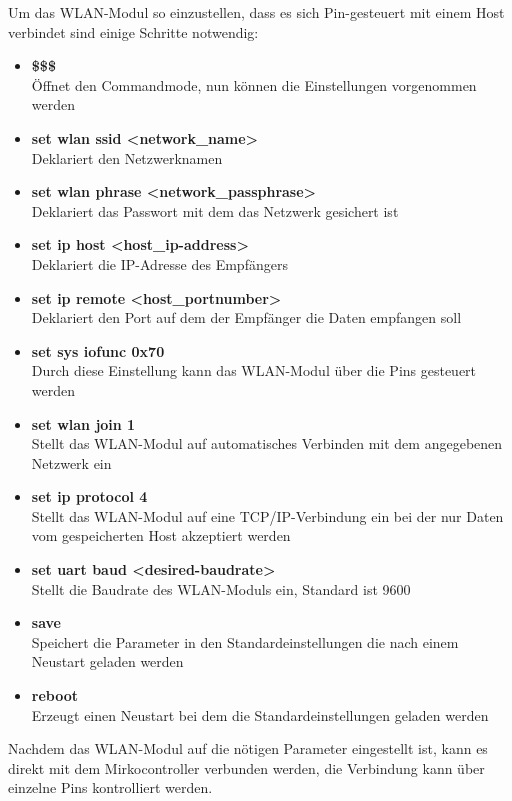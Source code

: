 Um das WLAN-Modul so einzustellen, dass es sich Pin-gesteuert mit einem Host verbindet sind einige Schritte notwendig:
  \begin{itemize}
    \item \textbf{\$\$\$}\\
    Öffnet den Commandmode, nun können die Einstellungen vorgenommen werden
    \item \textbf{set wlan ssid <network\_name>}\\
    Deklariert den Netzwerknamen
    \item \textbf{set wlan phrase <network\_passphrase>}\\
    Deklariert das Passwort mit dem das Netzwerk gesichert ist
    \item \textbf{set ip host <host\_ip-address>}\\
    Deklariert die IP-Adresse des Empfängers
    \item \textbf{set ip remote <host\_portnumber>}\\
    Deklariert den Port auf dem der Empfänger die Daten empfangen soll
    \item \textbf{set sys iofunc 0x70}\\
    Durch diese Einstellung kann das WLAN-Modul über die Pins gesteuert werden
    \item \textbf{set wlan join 1}\\
    Stellt das WLAN-Modul auf automatisches Verbinden mit dem angegebenen Netzwerk ein
    \item \textbf{set ip protocol 4}\\
    Stellt das WLAN-Modul auf eine TCP/IP-Verbindung ein bei der nur Daten vom gespeicherten Host akzeptiert werden
    \item \textbf{set uart baud <desired-baudrate>}\\
    Stellt die Baudrate des WLAN-Moduls ein, Standard ist 9600
    \item \textbf{save}\\
    Speichert die Parameter in den Standardeinstellungen die nach einem Neustart geladen werden
    \item \textbf{reboot}\\
    Erzeugt einen Neustart bei dem die Standardeinstellungen geladen werden
  \end{itemize}
  Nachdem das WLAN-Modul auf die nötigen Parameter eingestellt ist, kann es direkt mit dem Mirkocontroller verbunden werden, die Verbindung kann über einzelne Pins kontrolliert
  werden.

